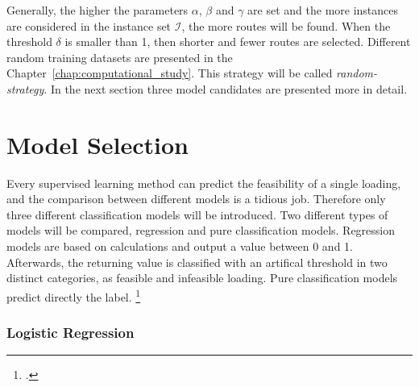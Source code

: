 Generally, the higher the parameters $\alpha$, $\beta$ and $\gamma$ are set and the more instances
are considered in the instance set $\mathcal{I}$, the more routes will be found. When the threshold $\delta$
is smaller than 1, then shorter and fewer routes are selected. Different
random training datasets are presented in the Chapter~\ref{chap:computational_study}.
This strategy will be called \textit{random-strategy}. In the next section three model candidates
are presented more in detail.

\section{Model Selection}
\label{sec:modelselection}
Every supervised learning method can predict the feasibility of a single loading, and the comparison
between different models is a tidious job. Therefore only three different classification
models will be introduced.
Two different types of models will be compared, regression and pure classification models. Regression
models are based on calculations and output a value between 0 and 1. Afterwards, the returning value is classified with
an artifical threshold in two distinct categories, as feasible and infeasible loading. Pure classification
models predict directly the label. \footcite[cf.][p. 5]{nasteski_overview_2017}

\subsubsection{Logistic Regression}

